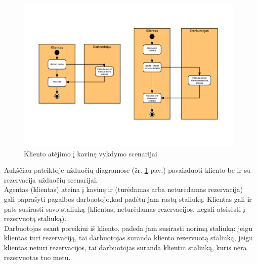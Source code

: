 \documentclass{VUMIFPSkursinis}
\begin{document}
	\begin {figure}[H]
	\centering
		\caption{Kliento atėjimo į kavinę vykdymo scenarijai}
		\includegraphics[scale=1]{img/3lab/Diagrama3}
		
		\label{fig:diagrama3}
	\end{figure}

Aukščiau pateiktoje užduočių diagramose (žr. \ref{fig:diagrama3} pav.) pavaizduoti kliento be ir su rezervacija užduočių scenarijai.\\ 
Agentas (klientas) ateina į kavinę ir (turėdamas arba neturėdamas rezervacija) gali paprašyti pagalbos darbuotojo,kad padėtų jam rastų staliuką. Klientas gali ir pats susirasti savo staliuką (klientas, neturėdamas rezervacijos, negali atsisėsti į rezervuotą staliuką). \\
Darbuotojas esant poreikiui iš kliento, padeda jam susirasti norimą staliuką: jeigu klientas turi rezervaciją, tai darbuotojas suranda kliento rezervuotą staliuką, jeigu klientas neturi rezervacijos, tai darbuotojas suranda klientui staliuką, kuris nėra rezervuotas tuo metu.\\

\end{document}
